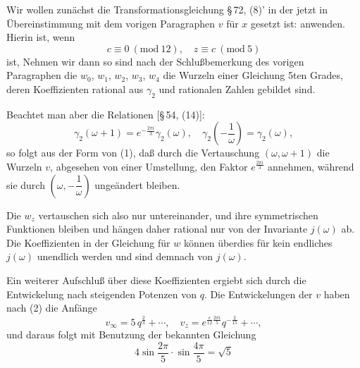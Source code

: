 
Wir wollen zunächst die Transformationsgleichung \S\,72, (8)'
in der jetzt in Übereinstimmung mit dem vorigen Paragraphen
$v$ für $x$ gesetzt ist:
anwenden. Hierin ist, wenn
\[
c \equiv 0 \ (\mathrm{mod}\ 12), \quad z \equiv c \ (\mathrm{mod}\ 5)
\]
ist,
Nehmen wir dann
so sind nach der Schlußbemerkung des vorigen Paragraphen die
$w_0$, $w_1$, $w_2$, $w_3$, $w_4$ die Wurzeln einer Gleichung 5ten Grades,
deren Koeffizienten rational aus $\gamma_2$ und rationalen Zahlen gebildet
 sind.

Beachtet man aber die Relationen [\S\,54, (14)]:
\[
\gamma_2(\omega+1) = e^{-\frac{2\pi i}{3}} \gamma_2(\omega), \quad \gamma_2\left(-\frac{1}{\omega}\right) = \gamma_2(\omega),
\]
so folgt aus der Form von (1), daß durch die Vertauschung
$(\omega, \omega+1)$ die Wurzeln $v$, abgesehen von einer Umstellung, den
Faktor $e^{\frac{2\pi i}{3}}$ annehmen, während sie durch $\left(\omega, -\dfrac{1}{\omega}\right)$ ungeändert
bleiben.

Die $w_z$ vertauschen sich also nur untereinander, und
ihre symmetrischen Funktionen bleiben  und hängen
daher rational nur von der Invariante $j(\omega)$ ab. Die Koeffizienten
in der Gleichung für $w$ können überdies für kein endliches $j(\omega)$
unendlich werden und sind demnach 
von $j(\omega)$.

Ein weiterer Aufschluß über diese Koeffizienten ergiebt sich
durch die Entwickelung nach steigenden Potenzen von $q$. Die
Entwickelungen der $v$ haben nach (2) die Anfänge
\[
v_\infty = 5\,q^{\frac{2}{3}} + \cdots, \quad v_z = e^{\frac{c}{12}\frac{2\pi i}{5}} q^{-\frac{2}{15}} + \cdots,
\]
und daraus folgt mit Benutzung der bekannten Gleichung
\[
4\sin\frac{2\pi}{5}\cdot\sin\frac{4\pi}{5} = \sqrt{5}
\]
